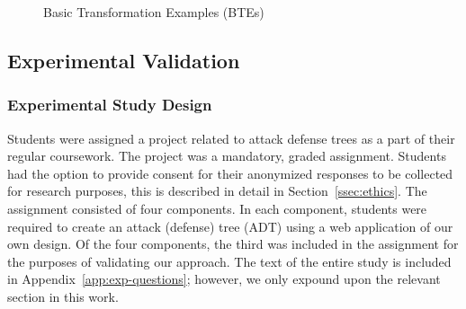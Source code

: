 \begin{figure}
\begin{subfigure}[b]{\CEWidth}
{            
        }
        \label{fig:b}
    \end{subfigure}
\begin{subfigure}[b]{\CEWidth}
        \centering
        \resizebox{2cm}{!}{
            
        }
        \label{fig:b}
    \end{subfigure}
\begin{subfigure}[b]{\CEWidth}
        \centering
        \resizebox{2cm}{!}{
            
        }
        \label{fig:b}
    \end{subfigure}
\begin{subfigure}[b]{\CEWidth}
        \centering
        \resizebox{2cm}{!}{
            
        }
        \label{fig:b}
    \end{subfigure}
\begin{subfigure}[b]{\CEWidth}
        \centering
        \resizebox{1.8cm}{!}{
            
        }
        \label{fig:b}
    \end{subfigure}
\caption{Basic Transformation Examples (BTEs)}\label{fig:counterexamples}
\end{figure}





\subsection{Experimental Validation}

\subsubsection{Experimental Study Design}
\label{ssec:method-study-design}

Students were assigned a project related to attack defense trees as a part of their regular coursework. The project was a mandatory, graded assignment. Students had the option to provide consent for their anonymized responses to be collected for research purposes, this is described in detail in Section~\ref{ssec:ethics}. The assignment consisted of four components. In each component, students were required to create an attack (defense) tree (ADT) using a web application of our own design. Of the four components, the third was included in the assignment for the purposes of validating our approach. The text of the entire study is included in Appendix~\ref{app:exp-questions}; however, we only expound upon the relevant section in this work.

